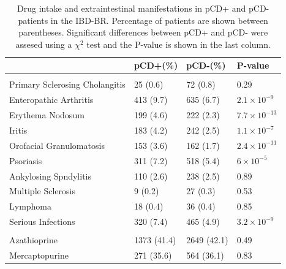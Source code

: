 \begin{table}
  \centering
  \caption[Drug intake and extraintestinal manifestations in IBD-BR]{Drug intake and extraintestinal manifestations in pCD+ and pCD- patients in the IBD-BR. Percentage of patients are shown between parentheses. Significant differences between pCD+ and pCD- were assesed using a $\chi^{2}$ test and the P-value is shown in the last column.}
  \label{table:drug_eim}
  \begin{tabular}[t]{llll}
  \toprule
  \textbf{} & \textbf{pCD+(\%)} & \textbf{pCD-(\%)} & \textbf{P-value}\\
  \midrule
  \addlinespace[0.3em]
  \multicolumn{4}{l}{\textbf{Extraintestinal Manifestations}}\\
  \hspace{1em}Primary Sclerosing Cholangitis & 25 (0.6) & 72 (0.8) & 0.29\\
  \hspace{1em}Enteropathic Arthritis & 413 (9.7) & 635 (6.7) & $2.1\times10^{-9}$\\
  \hspace{1em}Erythema Nodosum & 199 (4.6) & 222 (2.3) & $7.7\times10^{-13}$\\
  \hspace{1em}Iritis & 183 (4.2) & 242 (2.5) & $1.1\times10^{-7}$\\
  \hspace{1em}Orofacial Granulomatosis & 153 (3.6) & 162 (1.7) & $2.4\times10^{-11}$\\
  \hspace{1em}Psoriasis & 311 (7.2) & 518 (5.4) & $6\times10^{-5}$\\
  \hspace{1em}Ankylosing Spndylitis & 110 (2.6) & 238 (2.5) & 0.89\\
  \hspace{1em}Multiple Sclerosis & 9 (0.2) & 27 (0.3) & 0.53\\
  \hspace{1em}Lymphoma & 18 (0.4) & 36 (0.4) & 0.85\\
  \hspace{1em}Serious Infections & 320 (7.4) & 465 (4.9) & $3.2\times10^{-9}$\\
  \addlinespace[0.3em]
  \multicolumn{4}{l}{\textbf{Drugs}}\\
  \hspace{1em}Azathioprine & 1373 (41.4) & 2649 (42.1) & 0.49\\
  \hspace{1em}Mercaptopurine & 271 (35.6) & 564 (36.1) & 0.83\\

\end{tabular}
\end{table}
